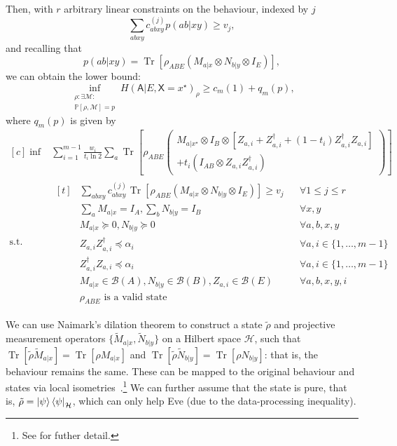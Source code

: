 \documentclass[10pt, a4paper]{article}
\numberwithin{equation}{section} %
\theoremstyle{definition}
\theoremstyle{plain}
\newcommand{\dintv}[2]{\mathopen\{#1,\ldots,#2\mathclose\}}
\newcommand{\?}{\mathrel{?}} %
\newcommand{\Tr}[2][]{\mathop{\mathrm{Tr}#1}\left[ #2 \right]} %
\newcommand{\Hs}{\mathcal{H}} %
\newcommand{\sM}{\mathcal{M}}
\newcommand{\sB}{\mathcal{B}}
\newcommand{\crv}[1]{\mathsf{#1}}
\newcommand{\behav}[2]{\mathbb{P}\left[#1, #2\right]}
\begin{document}
    Then, with \(r\) arbitrary linear constraints on the behaviour, indexed by \(j\)
    \[ \sum_{abxy} c^{(j)}_{abxy} p(ab|xy) \geq v_j, \]
    and recalling that
    \[ p(ab|xy) = \Tr{\rho_{A B E} \left(M_{a|x} \otimes N_{b|y} \otimes I_{E}\right) }, \]
    we can obtain the lower bound:
    \begin{equation}
    \inf_{\substack{\rho: \exists \sM : \\ \behav{\rho}{ \sM} = p}} H{(\crv{A}|E, \crv{X}=x^{\star})}_{\rho} \geq c_m(1) + q_m(p),
    \end{equation}
    where \(q_m(p)\) is given by
    \begin{equation}
      \begin{aligned}[c]
        \inf & \sum_{i=1}^{m-1} \frac{w_i}{t_i \ln 2} \sum_a \Tr{ 
          \rho_{A B E} \left(
            \begin{gathered}
              M_{a|x^{\star}} \otimes I_{B} \otimes \left[ Z_{a,i} + Z_{a,i}^{\dagger} + (1-t_i)  Z_{a,i}^{\dagger}Z_{a,i} \right] \\
              + t_i \left( I_{A B} \otimes Z_{a,i}Z_{a,i}^{\dagger}\right) 
            \end{gathered}
          \right)
        } \\
          \text{s.t.} & \begin{aligned}[t] 
            & \sum_{abxy} c^{(j)}_{abxy} \Tr{\rho_{A B E} \left(M_{a|x} \otimes N_{b|y} \otimes I_{E}\right) } \geq v_j & & \forall 1 \leq j \leq r \\
            & \sum_{a} M_{a|x} = I_{A}, \sum_{b} N_{b|y} = I_{B} & & \forall x, y \\
            & M_{a|x} \succeq 0, N_{b|y} \succeq 0 & & \forall a, b, x, y \\
          & Z_{a,i} Z_{a,i}^{\dagger} \preceq \alpha_i & & \forall a, i \in \dintv{1}{m-1} \\
          & Z_{a,i}^{\dagger} Z_{a,i} \preceq \alpha_i & & \forall a, i \in \dintv{1}{m-1} \\
            & M_{a|x} \in \sB(A), N_{b|y} \in \sB(B), Z_{a,i} \in \sB(E) & & \forall a, b, x, y, i \\
            & \rho_{A B E} \text{ is a valid state} & &
          \end{aligned}
          \end{aligned}
        \end{equation}

        We can use Naimark's dilation theorem to construct a state \(\tilde{\rho}\) and projective measurement operators \(\{\tilde{M}_{a|x}, \tilde{N}_{b|y}\}\) on a Hilbert space \(\Hs\), such that \(\Tr{\tilde{\rho}\tilde{M}_{a|x}} = \Tr{\rho M_{a|x}}\) and  \(\Tr{\tilde{\rho}\tilde{N}_{b|y}} = \Tr{\rho N_{b|y}}\): that is, the behaviour remains the same. These can be mapped to the original behaviour and states via local isometries~\cite{BFF_QRE}.\footnote{See  for futher detail.} We can further assume that the state is pure, that is, \(\tilde{\rho} = {\ket{\psi}\bra{\psi}}_{\Hs}\), which can only help Eve (due to the data-processing inequality).
\end{document}
